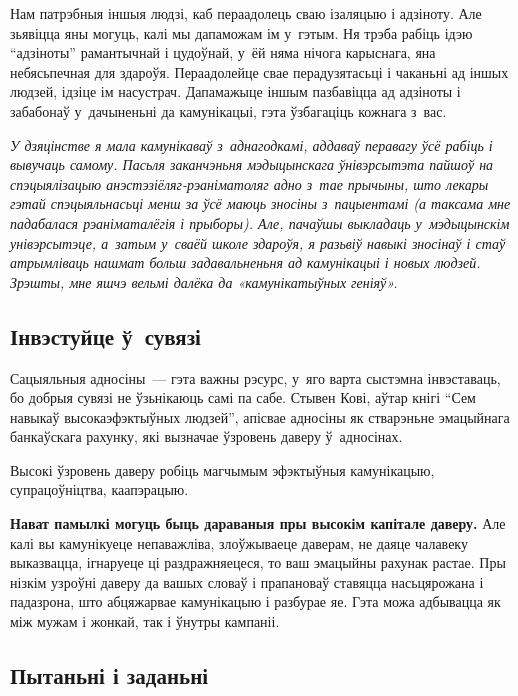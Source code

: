 Нам патрэбныя іншыя людзі, каб пераадолець сваю ізаляцыю і адзіноту. Але зьявіцца яны могуць, калі мы дапаможам ім у~гэтым. Ня трэба рабіць ідэю ``адзіноты'' рамантычнай і цудоўнай, у~ёй няма нічога карыснага, яна небясьпечная для здароўя. Пераадолейце свае перадузятасьці і чаканьні ад іншых людзей, ідзіце ім насустрач. Дапамажыце іншым пазбавіцца ад адзіноты і забабонаў у~дачыненьні да камунікацыі, гэта ўзбагаціць кожнага з~вас.

\emph{У дзяцінстве я мала камунікаваў з~аднагодкамі, аддаваў перавагу ўсё рабіць і вывучаць самому. Пасьля заканчэньня мэдыцынскага ўнівэрсытэта пайшоў на спэцыялізацыю анэстэзіёляг-рэаніматоляг адно з~тае прычыны, што лекары гэтай спэцыяльнасьці менш за ўсё маюць зносіны з~пацыентамі (а таксама мне падабалася рэаніматалёгія і прыборы). Але, пачаўшы выкладаць у~мэдыцынскім унівэрсытэце, а~затым у~сваёй школе здароўя, я разьвіў навыкі зносінаў і стаў атрымліваць нашмат больш задавальненьня ад камунікацыі і новых людзей. Зрэшты, мне яшчэ вельмі далёка да «камунікатыўных геніяў».}

\subsection*{Інвэстуйце ў~сувязі}

Сацыяльныя адносіны~--- гэта важны рэсурс, у~яго варта сыстэмна інвэставаць, бо добрыя сувязі не ўзьнікаюць самі па сабе. Стывен Кові, аўтар кнігі ``Сем навыкаў высокаэфэктыўных людзей'', апісвае адносіны як стварэньне эмацыйнага банкаўскага рахунку, які вызначае ўзровень даверу ў~адносінах.


Высокі ўзровень даверу робіць магчымым эфэктыўныя камунікацыю, супрацоўніцтва, каапэрацыю.

\textbf{Нават памылкі могуць быць дараваныя пры высокім капітале даверу.} Але калі вы камунікуеце непаважліва, злоўжываеце даверам, не даяце чалавеку выказвацца, ігнаруеце ці раздражняецеся, то ваш эмацыйны рахунак растае. Пры нізкім узроўні даверу да вашых словаў і прапановаў ставяцца насьцярожана і падазрона, што абцяжарвае камунікацыю і разбурае яе. Гэта можа адбывацца як між мужам і жонкай, так і ўнутры кампаніі.

\subsection*{Пытаньні і заданьні}

